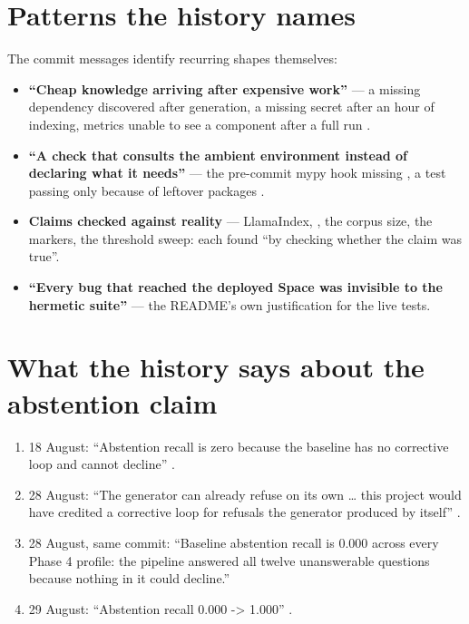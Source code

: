 \section{Patterns the history names}

The commit messages identify recurring shapes themselves:

\begin{itemize}
  \item \textbf{\enquote{Cheap knowledge arriving after expensive work}} --- a missing dependency discovered after generation, a missing secret after an hour of indexing, metrics unable to see a component after a full run .
  \item \textbf{\enquote{A check that consults the ambient environment instead of declaring what it needs}} --- the pre-commit mypy hook missing , a test passing only because of leftover packages .
  \item \textbf{Claims checked against reality} --- LlamaIndex, , the corpus size, the markers, the threshold sweep: each found \enquote{by checking whether the claim was true}.
  \item \textbf{\enquote{Every bug that reached the deployed Space was invisible to the hermetic suite}} --- the README's own justification for the live tests.
\end{itemize}

\section{What the history says about the abstention claim}
\label{sec:history-lesson}

\begin{verified}
\begin{enumerate}
  \item 18 August: \enquote{Abstention recall is zero because the baseline has no corrective loop and cannot decline} .
  \item 28 August: \enquote{The generator can already refuse on its own \ldots{} this project would have credited a corrective loop for refusals the generator produced by itself} .
  \item 28 August, same commit: \enquote{Baseline abstention recall is 0.000 across every Phase 4 profile: the pipeline answered all twelve unanswerable questions because nothing in it could decline.}
  \item 29 August: \enquote{Abstention recall 0.000 -> 1.000} .
\end{enumerate}
\end{verified}

